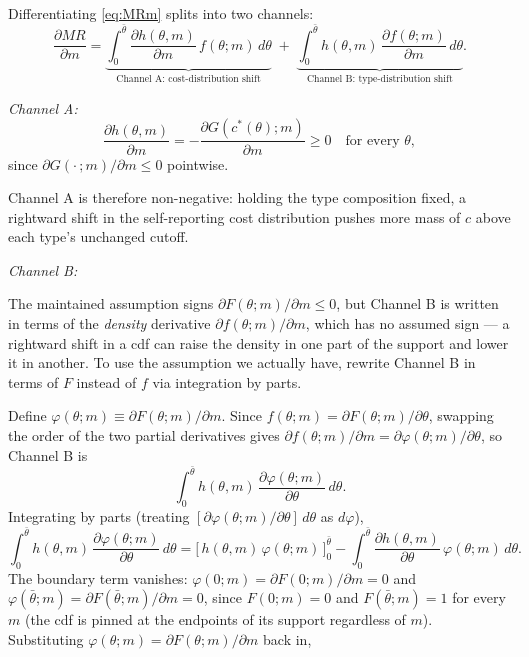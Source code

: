 \documentclass[12pt]{article}
\begin{document}
	Differentiating \eqref{eq:MRm} splits into two channels:
	\begin{equation}\label{eq:split}
		\frac{\partial MR}{\partial m} = \underbrace{\int_0^{\bar\theta} \frac{\partial h(\theta,m)}{\partial m}\, f(\theta;m)\, d\theta}_{\text{Channel A: cost-distribution shift}} \;+\; \underbrace{\int_0^{\bar\theta} h(\theta,m)\, \frac{\partial f(\theta;m)}{\partial m}\, d\theta}_{\text{Channel B: type-distribution shift}}.
	\end{equation}
	
	\textit{Channel A:}
	\[
	\frac{\partial h(\theta,m)}{\partial m} = -\frac{\partial G(c^*(\theta);m)}{\partial m} \ge 0 \quad \text{for every } \theta,
	\]
	since $\partial G(\cdot\,;m)/\partial m \le 0$ pointwise. 
    
    Channel A is therefore non-negative: holding the type composition fixed, a rightward shift in the self-reporting cost distribution pushes more mass of $c$ above each type's unchanged cutoff.

	\textit{Channel B:}

    The maintained assumption signs $\partial F(\theta;m)/\partial m \le 0$, but Channel B is written in terms of the \emph{density} derivative $\partial f(\theta;m)/\partial m$, which has no assumed sign — a rightward shift in a cdf can raise the density in one part of the support and lower it in another. To use the assumption we actually have, rewrite Channel B in terms of $F$ instead of $f$ via integration by parts.

	Define $\varphi(\theta;m) \equiv \partial F(\theta;m)/\partial m$. Since $f(\theta;m) = \partial F(\theta;m)/\partial\theta$, swapping the order of the two partial derivatives gives $\partial f(\theta;m)/\partial m = \partial \varphi(\theta;m)/\partial\theta$, so Channel B is
	\[
	\int_0^{\bar\theta} h(\theta,m)\,\frac{\partial \varphi(\theta;m)}{\partial\theta}\, d\theta.
	\]
	Integrating by parts (treating $[\partial \varphi(\theta;m)/\partial\theta]\,d\theta$ as $d\varphi$),
	\[
	\int_0^{\bar\theta} h(\theta,m)\,\frac{\partial \varphi(\theta;m)}{\partial\theta}\, d\theta = \Big[\,h(\theta,m)\,\varphi(\theta;m)\,\Big]_0^{\bar\theta} - \int_0^{\bar\theta} \frac{\partial h(\theta,m)}{\partial\theta}\,\varphi(\theta;m)\, d\theta.
	\]
	The boundary term vanishes: $\varphi(0;m) = \partial F(0;m)/\partial m = 0$ and $\varphi(\bar\theta;m) = \partial F(\bar\theta;m)/\partial m = 0$, since $F(0;m)=0$ and $F(\bar\theta;m)=1$ for every $m$ (the cdf is pinned at the endpoints of its support regardless of $m$). Substituting $\varphi(\theta;m) = \partial F(\theta;m)/\partial m$ back in,
\end{document}
